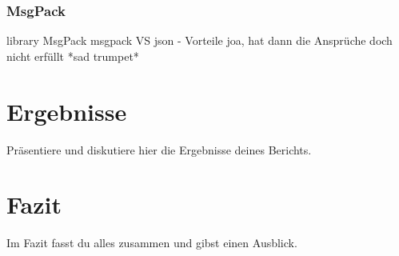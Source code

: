 \documentclass[a4paper, 12pt]{article}
\begin{document}
\subsubsection{MsgPack}\label{msgpack}
library MsgPack
msgpack VS json - Vorteile
joa, hat dann die Ansprüche doch nicht erfüllt *sad trumpet*

\newpage
\section{Ergebnisse}
Präsentiere und diskutiere hier die Ergebnisse deines Berichts.

\newpage
\section{Fazit}
Im Fazit fasst du alles zusammen und gibst einen Ausblick.

\newpage


\end{document}
